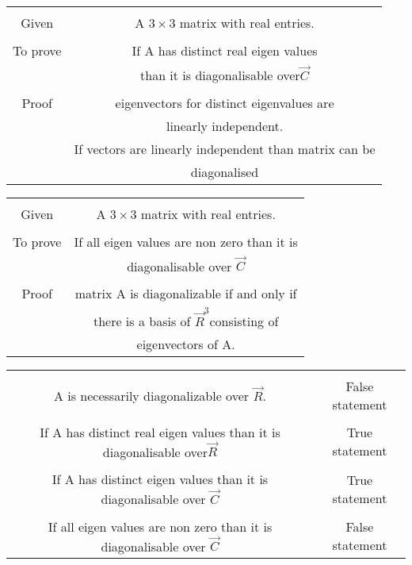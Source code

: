 \documentclass[journal,12pt,twocolumn]{IEEEtran}
\begin{document}
\clearpage
\renewcommand{\thetable}{3}
\begin{table*}[ht]
\begin{center}
\begin{tabular}{|c|c|}
\hline
& \\
Given & A $3\times 3$ matrix  with real entries.\\
\hline
& \\
To prove & If A has distinct real  eigen values\\
& than  it is diagonalisable over$\vec{C}$\\
\hline
& \\
Proof &  eigenvectors for distinct eigenvalues are \\
& linearly independent. \\
& If vectors are linearly independent than matrix can be\\ & diagonalised\\
\hline
\end{tabular}
\end{center}
\label{table:3}
\end{table*}
\renewcommand{\thetable}{4}
\begin{table*}[ht]
\begin{center}
\begin{tabular}{|c|c|}
\hline
& \\
Given & A $3\times 3$ matrix  with real entries.\\
\hline
& \\
To prove & If all eigen values are non zero than it is\\ & diagonalisable over $\vec{C}$\\
\hline
& \\
Proof &  matrix A is diagonalizable if and only if\\ &there is a basis of $\vec{R}^3 $consisting of\\
& eigenvectors of A. \\
\hline
\end{tabular}
\label{table:4}
\end{center}
\end{table*}
\renewcommand{\thetable}{5}
\begin{table*}[ht]
\begin{center}
\begin{tabular}{|c|c|}
\hline
& \\
A  is necessarily diagonalizable over $\vec{R}$.
& False statement\\
\hline
& \\
If A has distinct real  eigen values than
it is diagonalisable over$\vec{R}$
& True statement\\
\hline
& \\
If A has distinct eigen values than
it is diagonalisable over $\vec{C}$
&  True statement\\
\hline
& \\
If all eigen values are non zero than it is diagonalisable over $\vec{C}$
& False statement\\
\hline
\end{tabular}
\label{table:5}
\end{center}
\end{table*}
\end{document}
